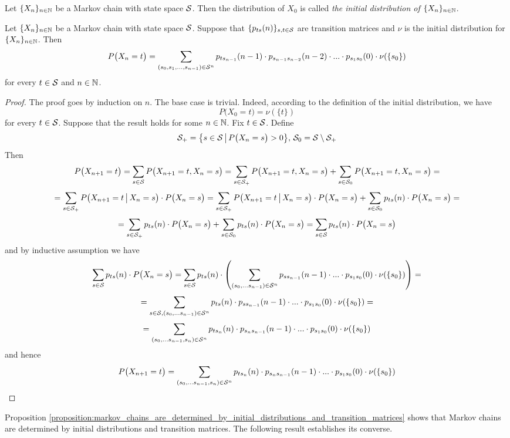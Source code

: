 \begin{definition}
Let $\{X_n\}_{n\in {\mathbb N}}$ be a Markov chain with state space ${\mathcal S}$. Then the distribution of $X_0$ is called \textit{the initial distribution of $\{X_n\}_{n\in {\mathbb N}}$}.
\end{definition}

\begin{proposition}\label{proposition:markov_chains_are_determined_by_initial_distributions_and_transition_matrices}
Let $\{X_n\}_{n\in {\mathbb N}}$ be a Markov chain with state space ${\mathcal S}$. Suppose that $\{p_{ts}(n)\}_{s,t\in {\mathcal S}}$ are transition matrices and $\nu$ is the initial distribution for $\{X_n\}_{n\in {\mathbb N}}$. Then
$$P\big(X_n = t\big) = \sum_{(s_0,s_1,...,s_{n-1})\in {\mathcal S}^{n}}p_{ts_{n-1}}(n-1)\cdot p_{s_{n-1}s_{n-2}}(n-2) \cdot ... \cdot p_{s_{1}s_0}(0)\cdot \nu(\{s_0\})$$
for every $t\in {\mathcal S}$ and $n\in {\mathbb N}$.
\end{proposition}
\begin{proof}
The proof goes by induction on $n$. The base case is trivial. Indeed, according to the definition of the initial distribution, we have
$$P\big(X_0 = t\big) = \nu(\{t\})$$
for every $t\in {\mathcal S}$. Suppose that the result holds for some $n\in {\mathbb N}$. Fix $t\in {\mathcal S}$. Define
$${\mathcal S}_+ = \big\{s\in {\mathcal S}\,\big|\,P\big(X_n = s\big)>0\big\},\,{\mathcal S}_0 = {\mathcal S}\setminus {\mathcal S}_+$$
Then
$$P\big(X_{n+1} = t\big) = \sum_{s\in {\mathcal S}}P\big(X_{n+1} = t,X_n=s\big) = \sum_{s\in {\mathcal S}_+}P\big(X_{n+1} = t,X_n=s\big) + \sum_{s\in {\mathcal S}_0}P\big(X_{n+1} = t,X_n=s\big) = $$
$$= \sum_{s\in {\mathcal S}_+}P\big(X_{n+1} = t\,\big|\,X_n=s\big)\cdot P\big(X_n=s\big) = \sum_{s\in {\mathcal S}_+}P\big(X_{n+1} = t\,\big|\,X_n=s\big)\cdot P\big(X_n=s\big) + \sum_{s\in {\mathcal S}_0}p_{ts}(n)\cdot P\big(X_n=s\big)=$$
$$=\sum_{s\in {\mathcal S}_+}p_{ts}(n)\cdot P\big(X_n=s\big) + \sum_{s\in {\mathcal S}_0}p_{ts}(n)\cdot P\big(X_n=s\big) = \sum_{s\in {\mathcal S}}p_{ts}(n)\cdot P\big(X_n=s\big)$$
and by inductive assumption we have
$$\sum_{s\in {\mathcal S}}p_{ts}(n)\cdot P\big(X_n=s\big) = \sum_{s\in {\mathcal S}} p_{ts}(n)\cdot \left(\sum_{(s_0,...s_{n-1})\in {\mathcal S}^n} p_{ss_{n-1}}(n-1)\cdot ... \cdot p_{s_1s_0}(0)\cdot \nu(\{s_0\})\right) = $$
$$= \sum_{s\in {\mathcal S},(s_0,...s_{n-1})\in {\mathcal S}^n} p_{ts}(n)\cdot p_{ss_{n-1}}(n-1)\cdot ... \cdot p_{s_1s_0}(0)\cdot \nu(\{s_0\}) =$$
$$=\sum_{(s_0,...s_{n-1},s_n)\in {\mathcal S}^n} p_{ts_n}(n)\cdot p_{s_ns_{n-1}}(n-1)\cdot ... \cdot p_{s_1s_0}(0)\cdot \nu(\{s_0\})$$
and hence
$$P\big(X_{n+1} = t\big) = \sum_{(s_0,...s_{n-1},s_n)\in {\mathcal S}^n} p_{ts_n}(n)\cdot p_{s_ns_{n-1}}(n-1)\cdot ... \cdot p_{s_1s_0}(0)\cdot \nu(\{s_0\})$$
\end{proof}
\noindent
Proposition \ref{proposition:markov_chains_are_determined_by_initial_distributions_and_transition_matrices} shows that Markov chains are determined by initial distributions and transition matrices. The following result establishes its converse.

